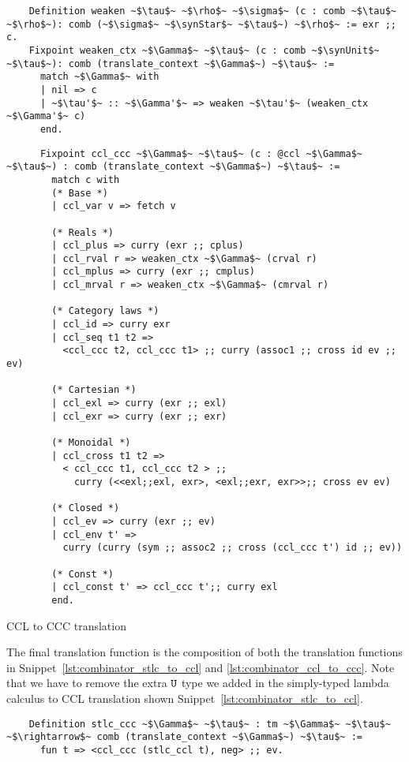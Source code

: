   \begin{verbatim}
    Definition weaken ~$\tau$~ ~$\rho$~ ~$\sigma$~ (c : comb ~$\tau$~ ~$\rho$~): comb (~$\sigma$~ ~$\synStar$~ ~$\tau$~) ~$\rho$~ := exr ;; c.
    Fixpoint weaken_ctx ~$\Gamma$~ ~$\tau$~ (c : comb ~$\synUnit$~ ~$\tau$~): comb (translate_context ~$\Gamma$~) ~$\tau$~ :=
      match ~$\Gamma$~ with
      | nil => c
      | ~$\tau'$~ :: ~$\Gamma'$~ => weaken ~$\tau'$~ (weaken_ctx ~$\Gamma'$~ c)
      end.
  \end{verbatim}


  \begin{listing}
    \begin{verbatim}
      Fixpoint ccl_ccc ~$\Gamma$~ ~$\tau$~ (c : @ccl ~$\Gamma$~ ~$\tau$~) : comb (translate_context ~$\Gamma$~) ~$\tau$~ :=
        match c with
        (* Base *)
        | ccl_var v => fetch v

        (* Reals *)
        | ccl_plus => curry (exr ;; cplus)
        | ccl_rval r => weaken_ctx ~$\Gamma$~ (crval r)
        | ccl_mplus => curry (exr ;; cmplus)
        | ccl_mrval r => weaken_ctx ~$\Gamma$~ (cmrval r)

        (* Category laws *)
        | ccl_id => curry exr
        | ccl_seq t1 t2 =>
          <ccl_ccc t2, ccl_ccc t1> ;; curry (assoc1 ;; cross id ev ;; ev)

        (* Cartesian *)
        | ccl_exl => curry (exr ;; exl)
        | ccl_exr => curry (exr ;; exr)

        (* Monoidal *)
        | ccl_cross t1 t2 =>
          < ccl_ccc t1, ccl_ccc t2 > ;;
            curry (<<exl;;exl, exr>, <exl;;exr, exr>>;; cross ev ev)

        (* Closed *)
        | ccl_ev => curry (exr ;; ev)
        | ccl_env t' =>
          curry (curry (sym ;; assoc2 ;; cross (ccl_ccc t') id ;; ev))

        (* Const *)
        | ccl_const t' => ccl_ccc t';; curry exl
        end.
    \end{verbatim}
    \caption{CCL to CCC translation}
    \label{lst:combinator_ccl_to_ccc}
  \end{listing}

  The final translation function is the composition of both the translation functions in Snippet~\ref{lst:combinator_stlc_to_ccl} and \ref{lst:combinator_ccl_to_ccc}.
  Note that we have to remove the extra $\texttt{U}$ type we added in the simply-typed lambda calculus to CCL translation shown Snippet~\ref{lst:combinator_stlc_to_ccl}.

  \begin{verbatim}
    Definition stlc_ccc ~$\Gamma$~ ~$\tau$~ : tm ~$\Gamma$~ ~$\tau$~ ~$\rightarrow$~ comb (translate_context ~$\Gamma$~) ~$\tau$~ :=
      fun t => <ccl_ccc (stlc_ccl t), neg> ;; ev.
  \end{verbatim}

